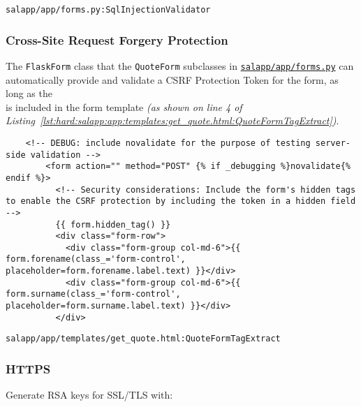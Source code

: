 \begin{listing}[H]
  \captionsetup{skip=\skiplistingcaptionlen}
  \inputminted[breakanywhere,firstline=49,lastline=68]{python3}{../uswacs-2-iy2d502-salapp/app/forms.py}
  \caption{\texttt{salapp/app/forms.py:SqlInjectionValidator}}
  \label{lst:hard:salapp:app:forms.py:SqlInjectionValidator}
\end{listing}

\subsubsection{Cross-Site Request Forgery Protection}
The \texttt{FlaskForm} class that the \texttt{QuoteForm} subclasses in \hyperref[fcl:uswacs-2-iy2d502-salapp:forms.py]{\texttt{salapp/app/forms.py}} can automatically provide and validate a CSRF Protection Token for the form, as long as the\\
 is included in the form template \textit{(as shown on line 4 of Listing~\ref{lst:hard:salapp:app:templates:get_quote.html:QuoteFormTagExtract})}.

\begin{listing}[H]
  \captionsetup{skip=\skiplistingcaptionlen}
  \begin{verbatim}
    <!-- DEBUG: include novalidate for the purpose of testing server-side validation -->
        <form action="" method="POST" {% if _debugging %}novalidate{% endif %}>
          <!-- Security considerations: Include the form's hidden tags to enable the CSRF protection by including the token in a hidden field -->
          {{ form.hidden_tag() }}
          <div class="form-row">
            <div class="form-group col-md-6">{{ form.forename(class_='form-control', placeholder=form.forename.label.text) }}</div>
            <div class="form-group col-md-6">{{ form.surname(class_='form-control', placeholder=form.surname.label.text) }}</div>
          </div>
  \end{verbatim}
  \caption{\texttt{salapp/app/templates/get\_quote.html:QuoteFormTagExtract}}
  \label{lst:hard:salapp:app:templates:get_quote.html:QuoteFormTagExtract}
\end{listing}

\subsubsection{HTTPS}
Generate RSA keys for SSL/TLS with:\\

